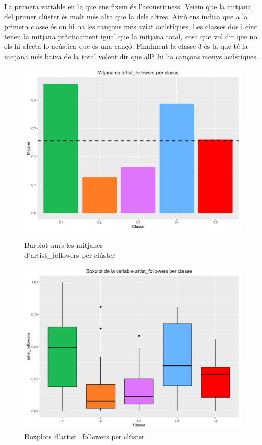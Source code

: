 \documentclass{article}
\begin{document}
La primera variable en la que ens fixem és l'acousticness. Veiem que la mitjana del primer clúster és molt més alta que la dels altres. Això ens indica que a la primera classe és on hi ha les cançons més aviat acústiques. Les classes dos i cinc tenen la mitjana pràcticament igual que la mitjana total, cosa que vol dir que no els hi afecta lo acústica que és una cançó. Finalment la classe 3 és la que té la mitjana més baixa de la total volent dir que allà hi ha cançons menys acústiques. 

\begin{figure}[H]
\centering
    \begin{minipage}{.49\textwidth}
        \centering
        \includegraphics[width=0.95\linewidth]{Images/5_Profiling/numeriques/Num_BarPlot_artist_followers.png}
        \caption{Barplot amb les mitjanes \\ d'artist\_followers per clúster}
        \label{fig:Num_BarPlot_artist_followers}
    \end{minipage}%
    \begin{minipage}{.49\textwidth}
        \centering
        \includegraphics[width=0.95\linewidth]{Images/5_Profiling/numeriques/Num_BoxPlot_artist_followers.png}
        \caption{Boxplots d'artist\_followers per clúster}
        \label{fig:Num_BoxPlot_artist_followers}
    \end{minipage}%
\end{figure}
\end{document}
